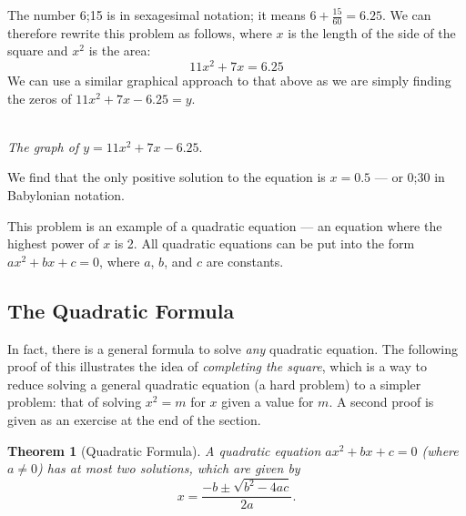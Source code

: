 \documentclass[a4paper,10pt,titlepage]{article}
\newtheorem*{thm}{Theorem}
\theoremstyle{definition}
\begin{document}
The number 6;15 is in sexagesimal notation; it means $ 6 + \frac{15}{60} = 6.25 $. We
can therefore rewrite this problem as follows, where $ x $ is the length of the side
of the square and $ x^2 $ is the area:
\begin{displaymath}
  11x^2 + 7x = 6.25
\end{displaymath}
We can use a similar graphical approach to that above as we are simply
finding the zeros of $ 11x^2 + 7x - 6.25 = y $.

\begin{center}\\
\textit{The graph of $ y = 11x^2 + 7x - 6.25 $}.
\end{center}

We find that the only positive solution to the equation is $ x = 0.5 $ --- or 0;30 in
Babylonian notation.

This problem is an example of a quadratic equation --- an equation where the highest
power of $ x $ is 2. All quadratic equations can be put into the form $ ax^2 + bx + c = 0 $,
where $ a $, $ b $, and $ c $ are constants.

\subsection*{The Quadratic Formula}
In fact, there is a general formula to solve \emph{any} quadratic equation. The
following proof of this illustrates the idea of \emph{completing the square}, which
is a way to reduce solving a general quadratic equation (a hard problem) to a simpler
problem: that of solving $ x^2 = m $ for $ x $ given a value for $ m $. A second
proof is given as an exercise at the end of the section.

\begin{thm}[Quadratic Formula]
  A quadratic equation $ ax^2 + bx + c = 0 $ (where $ a \neq 0 $) has at most
  two solutions, which are given by
  \begin{equation}
    x = \frac{-b \pm \sqrt{b^2 - 4ac}}{2a}.
  \end{equation}
\end{thm}
\end{document}

